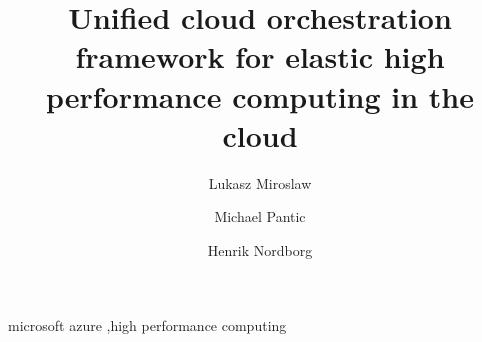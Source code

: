 \documentclass[3p,times]{elsarticle}
\begin{document}
\begin{frontmatter}




\title{Unified cloud orchestration framework for elastic high performance computing in the cloud}


\author[hsr,pwr]{Lukasz Miroslaw}
\author[hsr]{Michael Pantic}
\author[hsr]{Henrik Nordborg}

\address[hsr]{Institute for Energy Technology, Hochschule Rapperswil, Switzerland}
\address[pwr]{Wroclaw University of Technology, Poland}

\begin{abstract}



\end{abstract}

\begin{keyword}
microsoft azure \sep high performance computing



\end{keyword}

\end{frontmatter}
\end{document}
